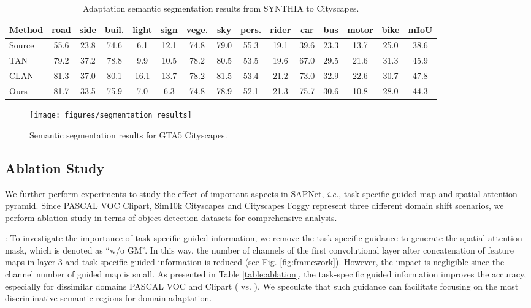\documentclass[runningheads]{llncs}
\def\ie{{\em i.e.}}
\begin{document}
\begin{table*}[t]
\centering
\caption{Adaptation semantic segmentation results from SYNTHIA to Cityscapes.}
\setlength{\tabcolsep}{1.5pt}
\begin{tabular}{l|ccccccccccccc|c}
\hline
Method & road &side &buil. &light &sign &vege. &sky &pers. &rider &car &bus &motor &bike &mIoU\\
\hline
Source &55.6 &23.8 &74.6 &6.1 &12.1 &74.8 &79.0 &55.3 &19.1 &39.6 &23.3 &13.7 &25.0 &38.6 \\
TAN \cite{DBLP:conf/cvpr/TsaiHSS0C18} &79.2 &37.2 &78.8 &9.9 &10.5 &78.2 &80.5 &53.5 &19.6 &67.0 &29.5 &21.6 &31.3 &45.9 \\
CLAN \cite{DBLP:conf/cvpr/Luo0GYY19} &81.3 &37.0 &80.1 &16.1 &13.7 &78.2 &81.5 &53.4 &21.2 &73.0 &32.9 &22.6 &30.7 &47.8 \\
Ours &81.7 &33.5 &75.9 &7.0 &6.3 &74.8 &78.9 &52.1 &21.3 &75.7 &30.6 &10.8 &28.0 &44.3 \\
\hline
\end{tabular}
\label{table:synthia2cityscapes}
\end{table*}

\begin{figure}[t]
\centering
\texttt{[image: figures/segmentation\_results]}
\caption{Semantic segmentation results for GTA5  Cityscapes.}
\label{fig:semantic}
\end{figure}

\subsection{Ablation Study}
We further perform experiments to study the effect of important aspects in SAPNet, \ie, task-specific guided map and spatial attention pyramid. Since PASCAL VOC  Clipart, Sim10k  Cityscapes and Cityscapes  Foggy represent three different domain shift scenarios, we perform ablation study in terms of object detection datasets for comprehensive analysis.

{:} To investigate the importance of task-specific guided information, we remove the task-specific guidance to generate the spatial attention mask, which is denoted as ``w/o GM''. In this way, the number of channels of the first convolutional layer after concatenation of feature maps in layer 3 and task-specific guided information is reduced (see Fig. \ref{fig:framework}). However, the impact is negligible since the channel number of guided map is small. As presented in Table \ref{table:ablation}, the task-specific guided information improves the accuracy, especially for dissimilar domains PASCAL VOC and Clipart ( vs. ). We speculate that such guidance can facilitate focusing on the most discriminative semantic regions for domain adaptation.
\end{document}

